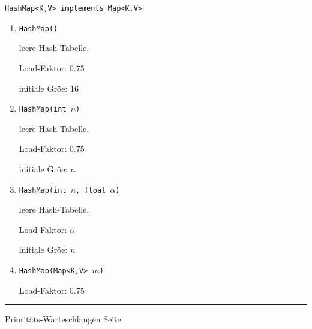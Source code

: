 \documentclass{slides}
\newcounter{mypage}
\begin{document}
\begin{slide}{}
\normalsize

\begin{center}
\texttt{HashMap<K,V> implements Map<K,V>}
\end{center}
\vspace*{0.5cm}

\footnotesize
\begin{enumerate}
\item \texttt{HashMap()}
  
      leere Hash-Tabelle.  

      Load-Faktor: $0.75$ 

      initiale Gr\"o\3e: 16
\item \texttt{HashMap(int $n$)}
  
      leere Hash-Tabelle.  

      Load-Faktor: $0.75$ 

      initiale Gr\"o\3e: $n$
\item \texttt{HashMap(int $n$, float $\alpha$)}

      leere Hash-Tabelle.  

      Load-Faktor: $\alpha$ 

      initiale Gr\"o\3e: $n$
\item \texttt{HashMap(Map<K,V> $m$)}

      Load-Faktor: $0.75$ 
\end{enumerate}


\vspace*{\fill}
\tiny \addtocounter{mypage}{1}
\rule{17cm}{1mm}
Priorit\"ats-Warteschlangen \hspace*{\fill} Seite 
\end{slide}

\end{document}
